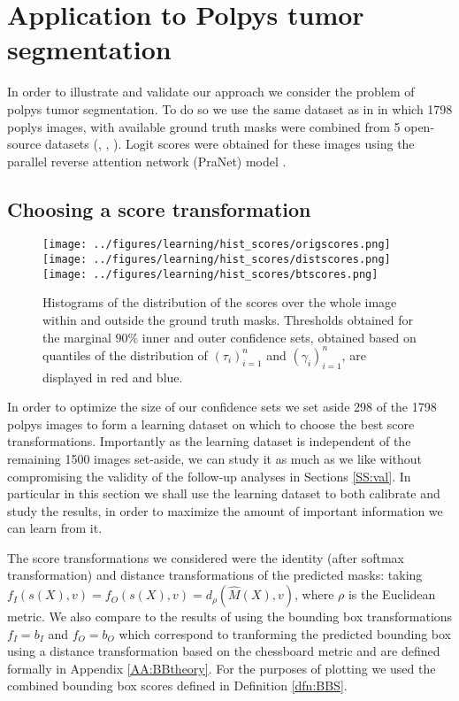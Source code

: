 \section{Application to Polpys tumor segmentation}\label{SS:res}
In order to illustrate and validate our approach we consider the problem of polpys tumor segmentation. To do so we use the same dataset as in \cite{Angelopoulos2022} in which 1798 poplys images, with available ground truth masks were combined from 5 open-source datasets (\cite{KVASIR2017}, \cite{Hyperkvasir2020} \cite{Bernal2012}, \cite{Silva2014}). Logit scores were obtained for these images using the parallel reverse attention network (PraNet) model \citep{PraNet2020}.

\subsection{Choosing a score transformation}\label{SS:learn}
\begin{figure}
	\centering
	\texttt{[image: ../figures/learning/hist\_scores/origscores.png]}
	\texttt{[image: ../figures/learning/hist\_scores/distscores.png]}
	\texttt{[image: ../figures/learning/hist\_scores/btscores.png]}
	\caption{Histograms of the distribution of the scores over the whole image within and outside the ground truth masks. Thresholds obtained for the marginal $90\%$ inner and outer confidence sets, obtained based on quantiles of the distribution of $(\tau_i)_{i = 1}^n$ and $(\gamma_i)_{i = 1}^n$, are displayed in red and blue.}
	\label{scorehists}
\end{figure}
In order to optimize the size of our confidence sets we set aside 298 of the 1798 polpys images to form a learning dataset on which to choose the best score transformations. Importantly as the learning dataset is independent of the remaining 1500 images set-aside, we can study it as much as we like without compromising the validity of the follow-up analyses in Sections \ref{SS:val}. In particular in this section we shall use the learning dataset to both calibrate and study the results, in order to maximize the amount of important information we can learn from it.

The score transformations we considered were the identity (after softmax transformation) and distance transformations of the predicted masks:  taking $f_I(s(X), v) = f_O(s(X), v) = d_\rho(\hat{M}(X), v)$, where $\rho$ is the Euclidean metric. We also compare to the results of using the bounding box transformations $f_I = b_I$ and $f_O = b_O$ which correspond to tranforming the predicted bounding box using a distance transformation based on the chessboard metric and are defined formally in Appendix \ref{AA:BBtheory}. For the purposes of plotting we used the combined bounding box scores defined in Definition \ref{dfn:BBS}.

